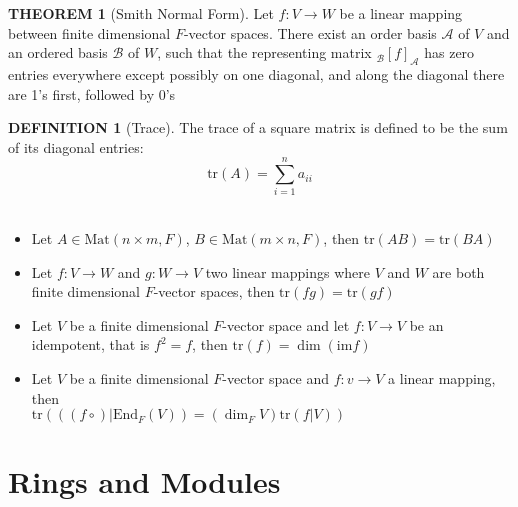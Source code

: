 \documentclass[12pt]{article}
\theoremstyle{definition}
\newtheorem{definition}{DEFINITION}[subsection]
\newtheorem{theorem}{THEOREM}[subsection]
\newcommand{\trace}[1]{\text{tr}(#1)}
\newcommand{\image}{\text{im}}
\newcommand{\Mat}{\text{Mat}}
\begin{document}
\begin{theorem}[Smith Normal Form]
    Let $f:V\rightarrow W$ be a linear mapping between finite dimensional $F$-vector spaces. There exist an order basis $\mathcal{A}$ of $V$ and an ordered basis $\mathcal{B}$ of $W$, such that the representing matrix $_\mathcal{B}[f]_\mathcal{A}$ has zero entries everywhere except possibly on one diagonal, and along the diagonal there are 1's first, followed by 0's  
\end{theorem}

\begin{definition}[Trace]
    The trace of a square matrix is defined to be the sum of its diagonal entries:
    $$\text{tr}(A) = \sum_{i=1}^{n}{a_{ii}}$$\\
    \begin{itemize}
        \item Let $A \in \Mat(n \times m, F)$, $B \in \Mat(m \times n, F)$, then $\trace{AB} = \trace{BA}$
        \item Let $f: V \rightarrow W$ and $g: W \rightarrow V$ two linear mappings where $V$ and $W$ are both finite dimensional $F$-vector spaces, then $\trace{fg} = \trace{gf}$
        \item Let $V$ be a finite dimensional $F$-vector space and let $f:V \rightarrow V$ be an idempotent, that is $f^2 = f$, then $\trace{f} = \dim(\image{f})$
        \item Let $V$ be a finite dimensional $F$-vector space and $f: v \rightarrow V$ a linear mapping, then\\ $\trace{((f\circ)|\text{End}_F(V)) = (\dim_F V)\trace{f|V}}$
    \end{itemize}
\end{definition}

\section{Rings and Modules}
\end{document}
